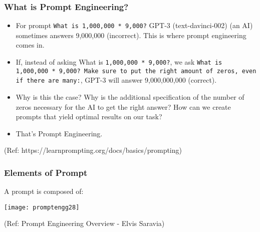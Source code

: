 \begin{frame}[fragile]\frametitle{What is Prompt Engineering?}

\begin{itemize}
\item For prompt \lstinline|What is 1,000,000 * 9,000?| GPT-3 (text-davinci-002) (an AI) sometimes answers 9,000,000 (incorrect). This is where prompt engineering comes in.
\item If, instead of asking What is \lstinline|1,000,000 * 9,000?|, we ask \lstinline|What is 1,000,000 * 9,000? Make sure to put the right amount of zeros, even if there are many:|, GPT-3 will answer 9,000,000,000 (correct). 
\item Why is this the case? Why is the additional specification of the number of zeros necessary for the AI to get the right answer? How can we create prompts that yield optimal results on our task? 			
\item That's Prompt Engineering.
\end{itemize}

{\tiny (Ref: https://learnprompting.org/docs/basics/prompting)}
\end{frame}



\begin{frame}[fragile]\frametitle{Elements of Prompt}

A prompt is composed of:

\begin{center}
\texttt{[image: promptengg28]}

{\tiny (Ref: Prompt Engineering Overview - Elvis Saravia)}

\end{center}		
		
\end{frame}


